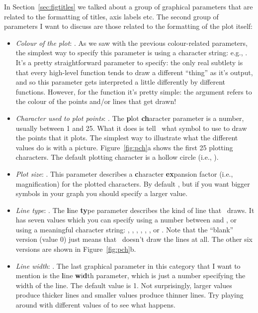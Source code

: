 In Section~\ref{sec:figtitles} we talked about a group of graphical parameters that are related to the formatting of titles, axis labels etc. The second group of parameters I want to discuss are those related to the formatting of the plot itself:
\begin{itemize} 
\item {\it Colour of the plot}: . As we saw with the previous colour-related parameters, the simplest way to specify this parameter is using a character string: e.g., . It's a pretty straightforward parameter to specify: the only real subtlety is that every high-level function tends to draw a different ``thing'' as it's output, and so this parameter gets interpreted a little differently by different functions. However, for the  function it's pretty simple: the  argument refers to the colour of the points and/or lines that get drawn! 
\item {\it Character used to plot points}: . The {\bf p}lot {\bf ch}aracter parameter is a number, usually between 1 and 25. What it does is tell \R\ what symbol to use to draw the points that it plots. The simplest way to illustrate what the different values do is with a picture. Figure~\ref{fig:pch}a shows the first 25 plotting characters. The default plotting character is a hollow circle (i.e., ).
\item {\it Plot size}: . This parameter describes a {\bf c}haracter {\bf ex}pansion factor (i.e., magnification) for the plotted characters. By default , but if you want bigger symbols in your graph you should specify a larger value.
\item {\it Line type}: . The {\bf l}ine {\bf ty}pe parameter describes the kind of line that \R\ draws. It has seven values which you can specify using a number between  and , or using a meaningful character string: , , , , , , or . Note that the ``blank'' version (value 0) just means that \R\ doesn't draw the lines at all. The other six versions are shown in Figure~\ref{fig:pch}b.
\item {\it Line width}: . The last graphical parameter in this category that I want to mention is the {\bf l}ine {\bf w}i{\bf d}th parameter, which is just a number specifying the width of the line. The default value is 1. Not surprisingly, larger values produce thicker lines and smaller values produce thinner lines. Try playing around with different values of  to see what happens.
\end{itemize}
